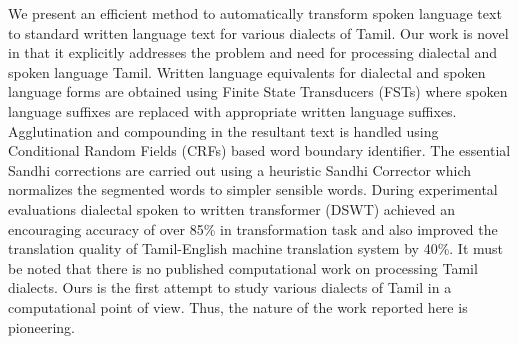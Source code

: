 We present an efficient method to automatically transform spoken language text to standard written language text for various dialects of Tamil. Our work is novel in that it explicitly addresses the problem and need for processing dialectal and spoken language Tamil. Written language equivalents for dialectal and spoken language forms are obtained using Finite State Transducers (FSTs) where spoken language suffixes are replaced with appropriate written language suffixes. Agglutination and compounding in the resultant text is handled using Conditional Random Fields (CRFs) based word boundary identifier. The essential Sandhi corrections are carried out using a heuristic Sandhi Corrector which normalizes the segmented words to simpler sensible words. During experimental evaluations dialectal spoken to written transformer (DSWT) achieved an encouraging accuracy of over 85\% in transformation task and also improved the translation quality of Tamil-English machine translation system by 40\%. It must be noted that there is no published computational work on processing Tamil dialects. Ours is the first attempt to study various dialects of Tamil in a computational point of view. Thus, the nature of the work reported here is pioneering.
